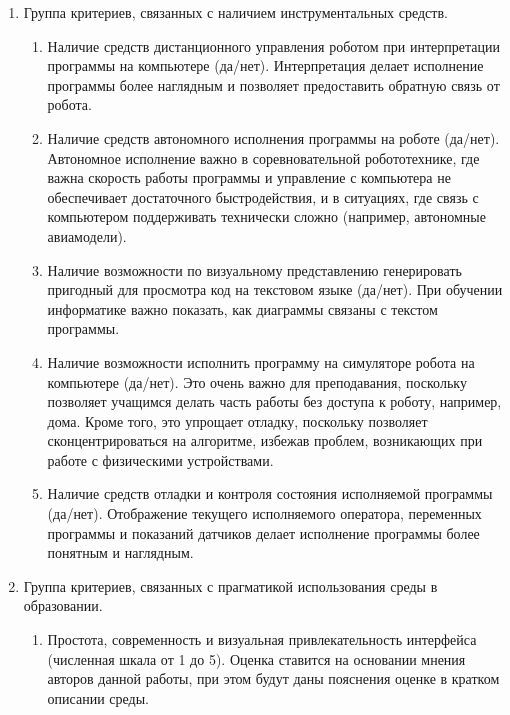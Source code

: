 \documentclass[a5paper]{article}
\begin{document}
\begin{enumerate}
\begin{enumerate}
    \end{enumerate}
    \item Группа критериев, связанных с наличием инструментальных средств.
    \begin{enumerate}
        \item Наличие средств дистанционного управления роботом при интерпретации программы на компьютере (да/нет). 
                Интерпретация делает исполнение программы более наглядным и позволяет предоставить обратную 
                связь от робота.
        \item Наличие средств автономного исполнения программы на роботе (да/нет). Автономное исполнение 
                важно в соревновательной робототехнике, где важна скорость работы программы и управление с 
                компьютера не обеспечивает достаточного быстродействия, и в ситуациях, где связь с компьютером 
                поддерживать технически сложно (например, автономные авиамодели).
        \item Наличие возможности по визуальному представлению генерировать пригодный для просмотра код на 
                текстовом языке (да/нет). При обучении информатике важно показать, как диаграммы 
                связаны с текстом программы.
        \item Наличие возможности исполнить программу на симуляторе робота на компьютере (да/нет). Это 
                очень важно для преподавания, поскольку позволяет учащимся делать часть работы без доступа к 
                роботу, например, дома. Кроме того, это упрощает отладку, поскольку позволяет сконцентрироваться 
                на алгоритме, избежав проблем, возникающих при работе с физическими устройствами.
        \item Наличие средств отладки и контроля состояния исполняемой программы (да/нет). Отображение 
                текущего исполняемого оператора, переменных программы и показаний датчиков делает исполнение 
                программы более понятным и наглядным.    
    \end{enumerate}
    \item Группа критериев, связанных с прагматикой использования среды в образовании.
    \begin{enumerate}
        \item Простота, современность и визуальная привлекательность интерфейса (численная шкала от 1 до 5). 
                Оценка ставится на основании мнения авторов данной работы, при этом будут даны пояснения 
                оценке в кратком описании среды.

\end{enumerate}
\end{enumerate}
\end{document}
